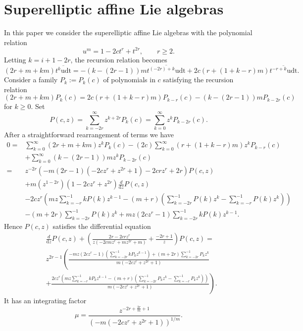 \documentclass[final,nopreprintline]{elsarticle}
\theoremstyle{definition}
\numberwithin{equation}{section}
\theoremstyle{remark}
\begin{document}
\section{Superelliptic affine Lie algebras}

In this paper we consider the superelliptic affine Lie algebras with the polynomial relation
\begin{equation*}
    u^m=1-2 c t^r+t^{2r},\qquad r\geq 2.
\end{equation*}
Letting $k=i+1-2r$, the recursion relation becomes
\begin{equation*}
    (2r+m+k m) \overline{t^k \text{udt}}=-(k-(2r-1)) m \overline{t^{(-2r)+k} \text{udt}}+2 c (r+(1+k-r) m) \overline{t^{-r+k} \text{udt}}.
\end{equation*}
Consider a family $P_k:=P_k(c)$ of polynomials in $c$ satisfying the recursion relation
\begin{equation}\label{recursion}
    (2r+m+k m) P_k(c)=2 c (r+(1+k-r) m) P_{k-r}(c)-(k-(2r-1)) m P_{k-2r}(c)
\end{equation}
for $k\geq 0$. Set
\begin{equation*}
    P(c,z)=\sum _{k=-2r}^{\infty } z^{k+2r} P_k(c)=\sum _{k=0}^{\infty } z^{k} P_{k-2r}(c).
\end{equation*}
After a straightforward rearrangement of terms we have
\begin{align*}
    0=&\sum _{k=0}^{\infty } (2r+m+k m) z^k P_k(c)-(2 c) \sum _{k=0}^{\infty } (r+(1+k-r) m) z^k P_{k-r}(c) \\
    & +\sum _{k=0}^{\infty } (k-(2r-1)) m z^k P_{k-2r}(c)\\
    = & z^{-2 r} (-m (2 r-1) (-2 c z^r+z^{2 r}+1)-2 c r z^r+2 r) P(c,z) \\
    &+m (z^{1 - 2 r}) (1 - 2 c z^r + z^{2 r}) \frac{d}{\textrm{d}z} P(c,z) \\
    &-2 c z^r \left(m z \sum _{k=-r}^{-1} k P(k) z^{k-1}-(m+r) \left(\sum _{k=-2 r}^{-1} P(k) z^k-\sum _{k=-r}^{-1} P(k) z^k\right)\right)\\
    &-(m+2 r) \sum _{k=-2 r}^{-1} P(k) z^k+m z \left(2 c z^r-1\right) \sum _{k=-2 r}^{-1} k P(k) z^{k-1}.
\end{align*}
Hence $P(c, z)$ satisfies the differential equation
\begin{align*}
    &\frac{d}{\textrm{d}z}P(c,z)+\left(\frac{2 r-2 c r z^r}{z(-2 c m z^r+m z^{2 r}+m)}+\frac{-2 r+1}{z}\right) P(c,z)= \\
    &z^{2 r-1}\left(\frac{ -m z \left(2 c z^r-1\right) \left(\sum _{k=-2 r}^{-1} k P_k z^{k-1}\right)+(m+2 r) \sum _{k=-2 r}^{-1} P_k z^k }{m \left(-2 c z^r+z^{2 r}+1\right)}\right.\\
    &\left. +\frac{2 c z^r \left(m z \sum _{k=-r}^{-1} k P_k z^{k-1}-(m+r) \left(\sum _{k=-2 r}^{-1} P_k z^k-\sum _{k=-r}^{-1} P_k z^k\right)\right)}{m \left(-2 c z^r+z^{2 r}+1\right)}\right).
\end{align*}
It has an integrating factor
\begin{equation*}
    \mu= \frac{z^{-2 r+\frac{2r}{m}+1}}{\left(-m \left(-2 c z^r+z^{2 r}+1\right)\right)^{1/m} }.
\end{equation*}
\end{document}
